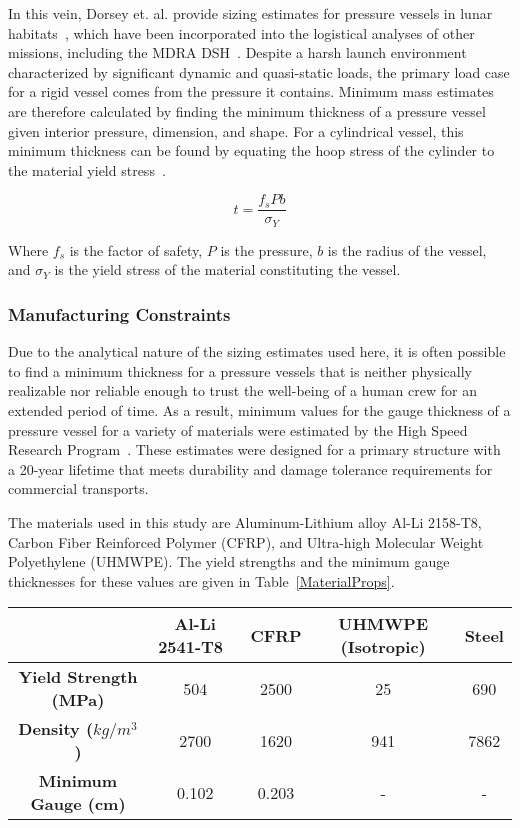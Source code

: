 \documentclass[twocolumn,letterpaper]{IEEEAerospaceCLS}  %
\begin{document}
In this vein, Dorsey et. al. provide sizing estimates for pressure vessels in lunar habitats~\cite{dorsey2008structural}, which have been incorporated into the logistical analyses of other missions, including the MDRA DSH~\cite{drake2010human}. Despite a harsh launch environment characterized by significant dynamic and quasi-static loads, the primary load case for a rigid vessel comes from the pressure it contains. Minimum mass estimates are therefore calculated by finding the minimum thickness of a pressure vessel given interior pressure, dimension, and shape. For a cylindrical vessel, this minimum thickness can be found by equating the hoop stress of the cylinder to the material yield stress~\cite{dorsey2008structural}.

\begin{equation}
	t = \frac{f_s P b}{\sigma_Y}
\end{equation}

Where $f_s$ is the factor of safety, $P$ is the pressure, $b$ is the radius of the vessel, and $\sigma_Y$ is the yield stress of the material constituting the vessel.

\subsubsection{Manufacturing Constraints}

Due to the analytical nature of the sizing estimates used here, it is often possible to find a minimum thickness for a pressure vessels that is neither physically realizable nor reliable enough to trust the well-being of a human crew for an extended period of time. As a result, minimum values for the gauge thickness of a pressure vessel for a variety of materials were estimated by the High Speed Research Program~\cite{wilhite2000overview}. These estimates were designed for a primary structure with a 20-year lifetime that meets durability and damage tolerance requirements for commercial transports.

The materials used in this study are Aluminum-Lithium alloy Al-Li 2158-T8, Carbon Fiber Reinforced Polymer (CFRP), and Ultra-high Molecular Weight Polyethylene (UHMWPE). The yield strengths and the minimum gauge thicknesses for these values are given in Table~\ref{MaterialProps}.

\begin{table*}
\renewcommand{\arraystretch}{1.3}
\caption{{\bf Material Properties} for the materials that will be used in this study. Minimum gauge values were given for CFRP and Al-Li, but not for UHMWPE}
\label{MaterialProps}
\centering
\begin{tabular}{|c|c|c|c|c|}
\hline
&\bfseries Al-Li 2541-T8~\cite{dorsey2008structural} & \bfseries CFRP\cite{donald1982adams} & \bfseries UHMWPE (Isotropic)\cite{UHMWPE} & \bfseries Steel\cite{skelton2014growth} \\
\hline\hline
{\bf Yield Strength (MPa)} & 504 & 2500 & 25 & 690\\
{\bf Density ($kg/m^3$)} & 2700 & 1620 & 941 & 7862 \\
{\bf Minimum Gauge (cm)} & 0.102 & 0.203 & - & -\\
\hline
\end{tabular}
\end{table*}
\end{document}
